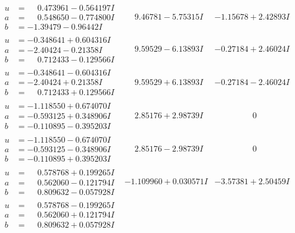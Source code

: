 \documentclass[1p]{elsarticle_modified}
\theoremstyle{definition}
\begin{document}
$$\begin{array}{c|c|c}
\begin{aligned}
u &= \phantom{-}0.473961 - 0.564197 I \\
a &= \phantom{-}0.548650 - 0.774800 I \\
b &= -1.39479 - 0.96442 I\end{aligned}
 & \phantom{-}9.46781 - 5.75315 I & -1.15678 + 2.42893 I \\ \hline\begin{aligned}
u &= -0.348641 + 0.604316 I \\
a &= -2.40424 - 0.21358 I \\
b &= \phantom{-}0.712433 - 0.129566 I\end{aligned}
 & \phantom{-}9.59529 - 6.13893 I & -0.27184 + 2.46024 I \\ \hline\begin{aligned}
u &= -0.348641 - 0.604316 I \\
a &= -2.40424 + 0.21358 I \\
b &= \phantom{-}0.712433 + 0.129566 I\end{aligned}
 & \phantom{-}9.59529 + 6.13893 I & -0.27184 - 2.46024 I \\ \hline\begin{aligned}
u &= -1.118550 + 0.674070 I \\
a &= -0.593125 + 0.348906 I \\
b &= -0.110895 - 0.395203 I\end{aligned}
 & \phantom{-}2.85176 + 2.98739 I & \phantom{-0.000000 } 0 \\ \hline\begin{aligned}
u &= -1.118550 - 0.674070 I \\
a &= -0.593125 - 0.348906 I \\
b &= -0.110895 + 0.395203 I\end{aligned}
 & \phantom{-}2.85176 - 2.98739 I & \phantom{-0.000000 } 0 \\ \hline\begin{aligned}
u &= \phantom{-}0.578768 + 0.199265 I \\
a &= \phantom{-}0.562060 - 0.121794 I \\
b &= \phantom{-}0.809632 - 0.057928 I\end{aligned}
 & -1.109960 + 0.030571 I & -3.57381 + 2.50459 I \\ \hline\begin{aligned}
u &= \phantom{-}0.578768 - 0.199265 I \\
a &= \phantom{-}0.562060 + 0.121794 I \\
b &= \phantom{-}0.809632 + 0.057928 I\end{aligned}

\end{array}$$
\end{document}
